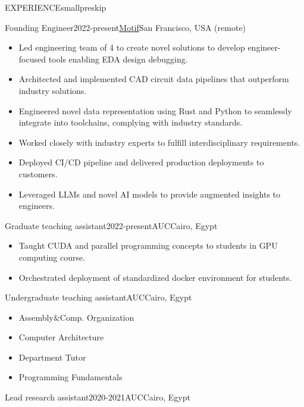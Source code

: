 \documentclass{resume}
\begin{document}
\begin{minipage}[t]{0.45\textwidth}
	\begin{rsection}{\MakeUppercase{experience}}{smallpreskip}
		\begin{rcontent}{Founding Engineer}{2022-present}{\href{https://lensed.app/}{Motif}}{San Francisco, USA (remote)}
		\begin{itemize}
			\item Led engineering team of 4 to create novel solutions to develop engineer-focused tools enabling EDA design debugging.
			\item Architected and implemented CAD circuit data pipelines that outperform industry solutions.
			\item Engineered novel data representation using Rust and Python to seamlessly integrate into toolchains, complying with industry standards.
			\item Worked closely with industry experts to fulfill interdisciplinary requirements.
			\item Deployed CI/CD pipeline and delivered production deployments to customers.
			\item Leveraged LLMs and novel AI models to provide augmented insights to engineers.
		\end{itemize}
		\end{rcontent}
		\divider
		\begin{rcontent}{Graduate teaching assistant}{2022-present}{AUC}{Cairo, Egypt}
			\begin{itemize}
				\item Taught CUDA and parallel programming concepts to students in GPU computing course.
				\item Orchestrated deployment of standardized docker environment for students.
			\end{itemize}
		\end{rcontent}
		\divider
		\begin{rcontent}{Undergraduate teaching assistant}{}{AUC}{Cairo, Egypt}
			\begin{itemize}
				\item Assembly\&Comp. Organization 
				\item Computer Architecture 
				\item Department Tutor 
				\item Programming Fundamentals 
			\end{itemize}
		\end{rcontent}
		\divider
		\begin{rcontent}{Lead research assistant}{2020-2021}{AUC}{Cairo, Egypt}

\end{rcontent}
\end{rsection}
\end{minipage}
\end{document}
